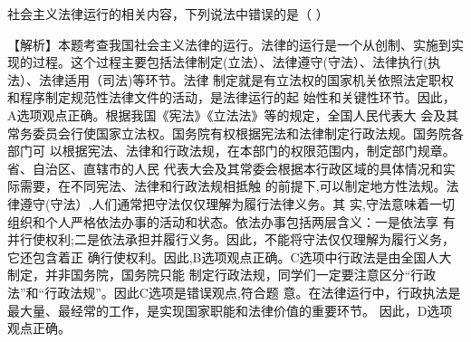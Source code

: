 \question 社会主义法律运行的相关内容，下列说法中错误的是（ ）
\par{}
\begin{solution}【解析】本题考查我国社会主义法律的运行。法律的运行是一个从创制、实施到实现的过程。这个过程主要包括法律制定(立法）、法律遵守(守法）、法律执行(执法）、法律适用（司法)等环节。法律
制定就是有立法权的国家机关依照法定职权和程序制定规范性法律文件的活动，是法律运行的起
始性和关键性环节。因此，A选项观点正确。根据我国《宪法》《立法法》等的规定，全国人民代表大
会及其常务委员会行使国家立法权。国务院有权根据宪法和法律制定行政法规。国务院各部门可
以根据宪法、法律和行政法规，在本部门的权限范围内，制定部门规章。省、自治区、直辖市的人民
代表大会及其常委会根据本行政区域的具体情况和实际需要，在不同宪法、法律和行政法规相抵触
的前提下,可以制定地方性法规。法律遵守(守法）,人们通常把守法仅仅理解为履行法律义务。其
实,守法意味着一切组织和个人严格依法办事的活动和状态。依法办事包括两层含义：一是依法享
有并行使权利;二是依法承担并履行义务。因此，不能将守法仅仅理解为履行义务，它还包含着正
确行使权利。因此,B选项观点正确。C选项中行政法是由全国人大制定，并非国务院，国务院只能
制定行政法规，同学们一定要注意区分``行政法''和``行政法规''。因此C选项是错误观点,符合题
意。在法律运行中，行政执法是最大量、最经常的工作，是实现国家职能和法律价值的重要环节。
因此，D选项观点正确。
\end{solution}
